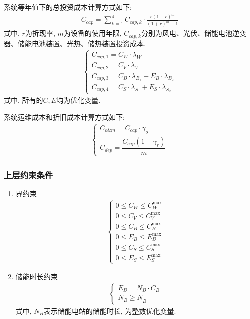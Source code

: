 \documentclass{article}
\begin{document}
系统等年值下的总投资成本计算方式如下:
\begin{align}
    C_{cap}=\sum_{k=1}^4C_{cap,k}\cdot\frac{r(1+r)^m}{(1+r)^m-1}
\end{align}
式中, $r$为折现率, $m$为设备的使用年限, $C_{cap,k}$分别为风电、光伏、储能电池逆变器、储能电池装置、光热、储热装置投资成本.
\begin{align}
    \begin{cases}C_{cap,1}=C_W\cdot\lambda_W\\C_{cap,2}=C_V\cdot\lambda_V\\C_{cap,3}=C_B\cdot\lambda_{B_1}+E_B\cdot\lambda_{B_2}\\C_{cap,4}=C_S\cdot\lambda_{S_1}+E_S\cdot\lambda_{S_2}\end{cases}
\end{align}
式中, 所有的$C, E$均为优化变量.

系统运维成本和折旧成本计算方式如下:
\begin{align}
    \begin{cases}C_{o\&m}=C_{cap}\cdot\gamma_o\\C_{dep}=\dfrac{C_{cap}(1-\gamma_r)}m\end{cases}
\end{align}


\subsubsection{上层约束条件}
\begin{enumerate}
    \item 界约束
    \begin{align}
        \begin{cases}0\le C_W\le C_W^{\max}\\0\le C_V\le C_V^{\max}\\0\le C_B\le C_B^{\max}\\0\le E_B\le E_B^{\max}\\0\le C_S\le C_S^{\max}\\0\le E_S\le E_S^{\max}\end{cases}
    \end{align}
    \item {\color{red}储能时长约束}
    \begin{align}
        \begin{cases}E_B=N_B\cdot C_B\\N_B\geq\underline{N}_B\end{cases}
    \end{align}
    式中, $N_B$表示储能电站的储能时长, 为整数优化变量.
\end{enumerate}
\end{document}
